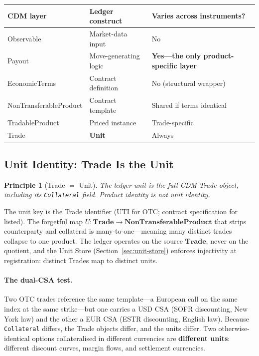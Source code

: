 \documentclass[11pt,a4paper]{article}
\newtheorem{principle}[definition]{Principle}
\begin{document}
\begin{center}\small
\begin{tabular}{lll}
\toprule
\textbf{CDM layer} & \textbf{Ledger construct} & \textbf{Varies across instruments?} \\
\midrule
Observable & Market-data input & No \\
Payout & Move-generating logic & \textbf{Yes---the only product-specific layer} \\
EconomicTerms & Contract definition & No (structural wrapper) \\
NonTransferableProduct & Contract template & Shared if terms identical \\
TradableProduct & Priced instance & Trade-specific \\
Trade & \textbf{Unit} & Always \\
\bottomrule
\end{tabular}
\end{center}

\subsection{Unit Identity: Trade Is the Unit}
\label{sec:cdm-trade}

\begin{principle}[Trade $=$ Unit]
The ledger unit is the full CDM Trade object, including its \texttt{Collateral} field. Product identity is not unit identity.
\end{principle}

The unit key is the Trade identifier (UTI for OTC; contract specification for listed). The forgetful map $U:\mathbf{Trade}\to\mathbf{NonTransferableProduct}$ that strips counterparty and collateral is many-to-one---meaning many distinct trades collapse to one product. The ledger operates on the source $\mathbf{Trade}$, never on the quotient, and the Unit Store (Section~\ref{sec:unit-store}) enforces injectivity at registration: distinct Trades map to distinct units.

\paragraph{The dual-CSA test.} Two OTC trades reference the same template---a European call on the same index at the same strike---but one carries a USD CSA (SOFR discounting, New York law) and the other a EUR CSA (ESTR discounting, English law). Because \texttt{Collateral} differs, the Trade objects differ, and the units differ. Two otherwise-identical options collateralised in different currencies are \textbf{different units}: different discount curves, margin flows, and settlement currencies.
\end{document}
